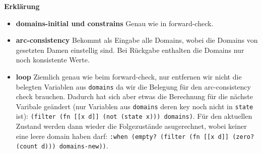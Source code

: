 \documentclass[a4paper,10pt]{article}
\begin{document}
\textbf{Erklärung}
\begin{itemize}
  \item \textbf{domains-initial und constrains} Genau wie in forward-check.
    \item \textbf{arc-consistency} Bekommt als Eingabe alle Domains, wobei die Domains von gesetzten Damen einstellig sind. Bei Rückgabe enthalten die Domains nur noch konsistente Werte.
    \item \textbf{loop} Ziemlich genau wie beim forward-check, nur entfernen wir nicht die belegten Variablen aus \texttt{domains} da wir die Belegung für den arc-consistency check brauchen. Dadurch hat sich aber etwas die Berechnung für die nächste Varibale geändert (nur Variablen aus \texttt{domains} deren key noch nicht in \texttt{state} ist): \texttt{(filter (fn [[x d]] (not (state x))) domains)}. Für den aktuellen Zustand werden dann wieder die Folgezustände asugerechnet, wobei keiner eine leere domain haben darf: \texttt{:when (empty? (filter (fn [[x d]] (zero? (count d))) domains-new))}.
\end{itemize}
\newpage
\end{document}
